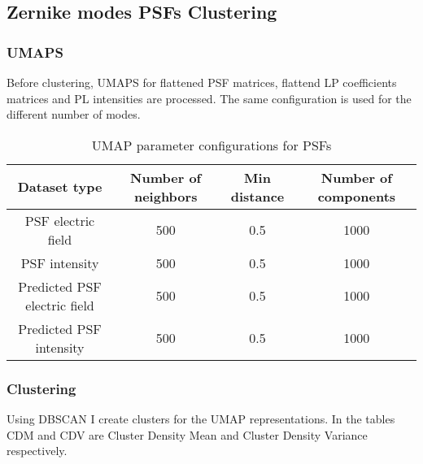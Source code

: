 \subsection{Zernike modes PSFs Clustering}

	\subsubsection{UMAPS}
		
		Before clustering, UMAPS for flattened PSF matrices, flattend LP coefficients matrices and PL intensities are processed. The same configuration is used for the different number of modes.
		
		\begin{table}[h!]
			\centering
			\begin{tabular}{|c|c|c|c|}
				\hline
				\textbf{Dataset type} & \textbf{Number of neighbors} & \textbf{Min distance} & \textbf{Number of components} \\
				\hline
				PSF electric field & 500 & 0.5 & 1000 \\
				\hline
				PSF intensity & 500 & 0.5 & 1000 \\
				\hline
				Predicted PSF electric field & 500 & 0.5 & 1000 \\
				\hline
				Predicted PSF intensity & 500 & 0.5 & 1000 \\
				\hline
			\end{tabular}
		\caption{UMAP parameter configurations for PSFs}
		\end{table}
		
	
	\subsubsection{Clustering}
		
		Using DBSCAN I create clusters for the UMAP representations. In the tables CDM and CDV are Cluster Density Mean and Cluster Density Variance respectively.
		
